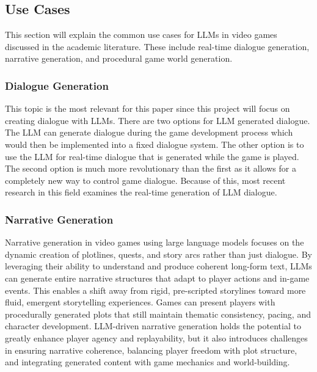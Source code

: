 \documentclass[10pt,twocolumn]{article}
\begin{document}
    \subsection{Use Cases}

        \par
        This section will explain the common use cases for LLMs in video games discussed in the academic literature. These include real-time dialogue generation, narrative generation, and procedural game world generation.
    
        \subsubsection{Dialogue Generation}
        
            \par
            This topic is the most relevant for this paper since this project will focus on creating dialogue with LLMs. There are two options for LLM generated dialogue. The LLM can generate dialogue during the game development process which would then be implemented into a fixed dialogue system. The other option is to use the LLM for real-time dialogue that is generated while the game is played. The second option is much more revolutionary than the first as it allows for a completely new way to control game dialogue. Because of this, most recent research in this field examines the real-time generation of LLM dialogue\cite{huang_generating_2024}\cite{akoury_framework_2023}\cite{csepregi_effect_nodate}\cite{cox_conversational_2024}.
    
        \subsubsection{Narrative Generation}
            
            \par
            Narrative generation in video games using large language models focuses on the dynamic creation of plotlines, quests, and story arcs rather than just dialogue. By leveraging their ability to understand and produce coherent long-form text, LLMs can generate entire narrative structures that adapt to player actions and in-game events. This enables a shift away from rigid, pre-scripted storylines toward more fluid, emergent storytelling experiences. Games can present players with procedurally generated plots that still maintain thematic consistency, pacing, and character development. LLM-driven narrative generation holds the potential to greatly enhance player agency and replayability, but it also introduces challenges in ensuring narrative coherence, balancing player freedom with plot structure, and integrating generated content with game mechanics and world-building.
\end{document}
